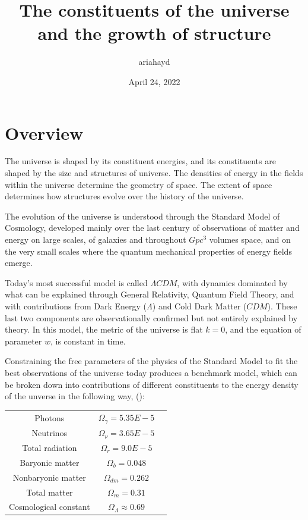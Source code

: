 \documentclass{paper}
\begin{document}
 

\title{The constituents of the universe and the growth of structure}
\author{ariahayd}
\date{April 24, 2022}
\maketitle

\section{Overview}
  The universe is shaped by its constituent energies, and its constituents are
  shaped by the size and structures of universe. The densities of energy in
  the fields within the universe determine the geometry of space. The extent
  of space determines how structures evolve over the history of the universe.

  The evolution of the universe is understood through the Standard Model of 
  Cosmology, developed mainly over the last century of observations of matter 
  and energy on large scales, of galaxies and throughout \(Gpc^3\) volumes 
  space, and on the very small scales where the quantum mechanical properties 
  of energy fields emerge. 

  Today's most successful model is called \(\Lambda CDM\), with dynamics 
  dominated by what can be explained through General Relativity, Quantum Field 
  Theory, and with contributions from Dark Energy (\(\Lambda\)) and Cold Dark 
  Matter (\(CDM\)). These last two components are observationally confirmed 
  but not entirely explained by theory. In this model, the metric of the 
  universe is flat \(k=0\), and the equation of parameter \(w\), is constant 
  in time.

  Constraining the free parameters of the physics of the Standard Model to
  fit the best observations of the universe today produces a benchmark model,
  which can be broken down into contributions of different 
  constituents to the energy density of the unverse in the following way,
  (\cite{ryden2003introduction}):

  \begin{center}
  \begin{tabular}{ c c c }
    Photons & \(\Omega_{\gamma} = 5.35E-5 \) \\
    Neutrinos & \(\Omega_{\nu} = 3.65E-5 \) \\
    Total radiation & \(\Omega_{r} = 9.0E-5 \) \\
    Baryonic matter & \(\Omega_{b} = 0.048 \) \\
    Nonbaryonic matter & \(\Omega_{dm} = 0.262 \) \\
    Total matter & \(\Omega_{m} = 0.31 \) \\
    Cosmological constant & \(\Omega_{\Lambda} \approx 0.69 \)
 \end{tabular}
 \end{center}
\end{document}
